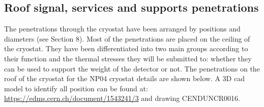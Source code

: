 \subsection{Roof signal, services and supports penetrations}

The penetrations through the cryostat have been arranged by positions and diameters (see Section 8). Most of the penetrations are placed on the ceiling of the cryostat. They have been differentiated into two main groups according to their function and the thermal stresses they will be submitted to: whether they can be used to support the weight of the detector or not.
The penetrations on the roof of the cryostat for the NP04 cryostat details are shown below.  A 3D cad model to identify all position can be found at:
\url{https://edms.cern.ch/document/1543241/3} and drawing CENDUNCR0016. 



